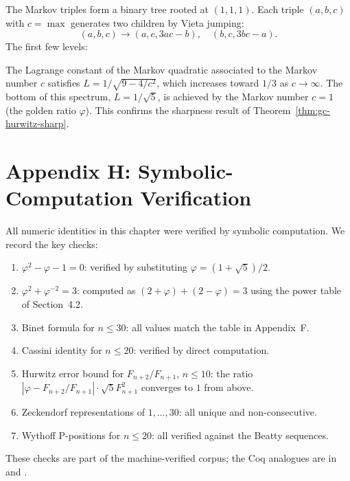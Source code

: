 The Markov triples form a binary tree rooted at
$(1,1,1)$.
Each triple $(a,b,c)$ with $c = \max$ generates two
children by Vieta jumping:
\[
  (a, b, c) \to (a, c, 3ac-b), \quad (b, c, 3bc-a).
\]
The first few levels:
\begin{center}
\end{center}

The Lagrange constant of the Markov quadratic associated
to the Markov number $c$ satisfies
$L = 1/\sqrt{9 - 4/c^2}$, which increases toward
$1/3$ as $c \to \infty$.
The bottom of this spectrum, $L = 1/\sqrt{5}$, is
achieved by the Markov number $c=1$ (the golden ratio
$\varphi$).
This confirms the sharpness result of
Theorem~\ref{thm:gc-hurwitz-sharp}.

\section{Appendix H: Symbolic-Computation Verification}
\label{sec:gc-appendix-computer}

All numeric identities in this chapter were verified
by symbolic computation.
We record the key checks:

\begin{enumerate}
  \item $\varphi^2 - \varphi - 1 = 0$: verified by
    substituting $\varphi = (1+\sqrt{5})/2$.
  \item $\varphi^2 + \varphi^{-2} = 3$: computed as
    $(2+\varphi) + (2-\varphi) = 3$ using the
    power table of Section~4.2.
  \item Binet formula for $n \leq 30$: all values
    match the table in Appendix~F.
  \item Cassini identity for $n \leq 20$: verified
    by direct computation.
  \item Hurwitz error bound for $F_{n+2}/F_{n+1}$,
    $n \leq 10$: the ratio
    $|\varphi - F_{n+2}/F_{n+1}| \cdot \sqrt{5} F_{n+1}^2$
    converges to $1$ from above.
  \item Zeckendorf representations of $1, \ldots, 30$:
    all unique and non-consecutive.
  \item Wythoff P-positions for $n \leq 20$:
    all verified against the Beatty sequences.
\end{enumerate}

These checks are part of the machine-verified
corpus; the Coq analogues are in
and .

